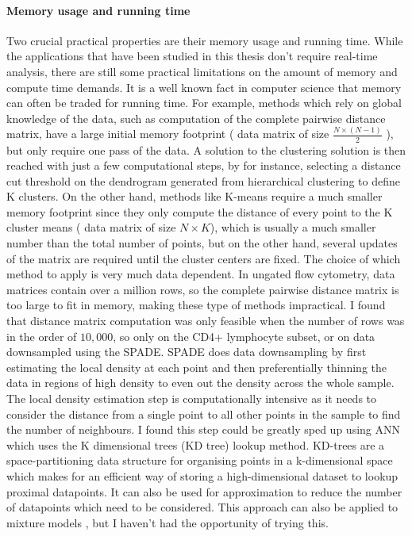 \paragraph{Memory usage and running time}
Two crucial practical properties are their memory usage and running time.
While the applications that have been studied in this thesis don’t require real-time analysis, there are still some practical limitations on the amount of memory and compute time demands.
It is a well known fact in computer science that memory can often be traded for running time.
For example, methods which rely on global knowledge of the data, such as computation of the complete pairwise distance matrix,
have a large initial memory footprint ( data matrix of size $\frac{N \times (N-1)}{2}$ ), but only require one pass of the data.
A solution to the clustering solution is then reached with just a few computational steps, by for instance,
selecting a distance cut threshold on the dendrogram generated from hierarchical clustering to define K clusters. 
On the other hand, methods like K-means require a much smaller memory footprint since they only compute the distance of every point to the K cluster means
( data matrix of size $N \times K$), which is usually a much smaller number than the total number of points,
but on the other hand, several updates of the matrix are required until the cluster centers are fixed.
The choice of which method to apply is very much data dependent.
In ungated flow cytometry, data matrices  contain over a million rows, so the complete pairwise distance matrix is too large to fit in memory,
making these type of methods impractical.
I found that distance matrix computation was only feasible when the number of rows was in the order of $10,000$,
so only on the CD4+ lymphocyte subset, or on data downsampled using the SPADE.
SPADE does data downsampling by first estimating the local density at each point
and then preferentially thinning the data in regions of high density to even out the density 
across the whole sample.
The local density estimation step is computationally intensive as it needs to consider the distance from
a single point to all other points in the sample to find the number of neighbours.
I found this step could be greatly sped up using ANN which uses the K dimensional trees (KD tree) lookup method.
KD-trees are a space-partitioning data structure for organising points in a k-dimensional space which makes for an efficient
way of storing a high-dimensional dataset to lookup proximal datapoints.
It can also be used for approximation to reduce the number of datapoints which need to be considered.
This approach can also be applied to mixture models \citep{McLachlan:2004uw}, but I haven’t had the opportunity of trying this. 


